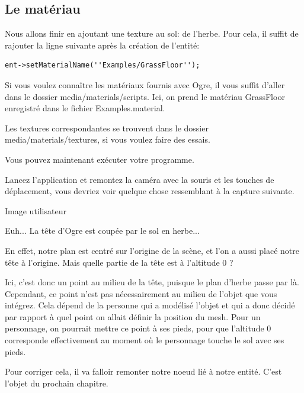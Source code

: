 \documentclass[10pt,a4paper]{report}
\begin{document}
\subsection{Le mat\'eriau}

Nous allons finir en ajoutant une texture au sol: de l'herbe. Pour cela, il suffit de rajouter la ligne suivante apr\`es la cr\'eation de l'entit\'e:
\begin{lstlisting}
ent->setMaterialName(''Examples/GrassFloor'');
\end{lstlisting}

Si vous voulez conna\^itre les mat\'eriaux fournis avec Ogre, il vous suffit d'aller dans le dossier media/materials/scripts. Ici, on prend le mat\'eriau GrassFloor enregistr\'e dans le fichier Examples.material. 

Les textures correspondantes se trouvent dans le dossier media/materials/textures, si vous voulez faire des essais.


Vous pouvez maintenant ex\'ecuter votre programme.

Lancez l'application et remontez la cam\'era avec la souris et les touches de d\'eplacement, vous devriez voir quelque chose ressemblant \`{a} la capture suivante.

Image utilisateur

Euh... La t\^ete d'Ogre est coup\'ee par le sol en herbe...

En effet, notre plan est centr\'e sur l'origine de la sc\`ene, et l'on a aussi plac\'e notre t\^ete \`{a} l'origine. Mais quelle partie de la t\^ete est \`{a} l'altitude 0 ?

Ici, c'est donc un point au milieu de la t\^ete, puisque le plan d'herbe passe par l\`{a}.
Cependant, ce point n'est pas n\'ecessairement au milieu de l'objet que vous int\'egrez. Cela d\'epend de la personne qui a mod\'elis\'e l'objet et qui a donc d\'ecid\'e par rapport \`{a} quel point on allait d\'efinir la position du mesh. Pour un personnage, on pourrait mettre ce point \`{a} ses pieds, pour que l'altitude 0 corresponde effectivement au moment o\`{u} le personnage touche le sol avec ses pieds.

Pour corriger cela, il va falloir remonter notre noeud li\'e \`{a} notre entit\'e. C'est l'objet du prochain chapitre.
\end{document}
